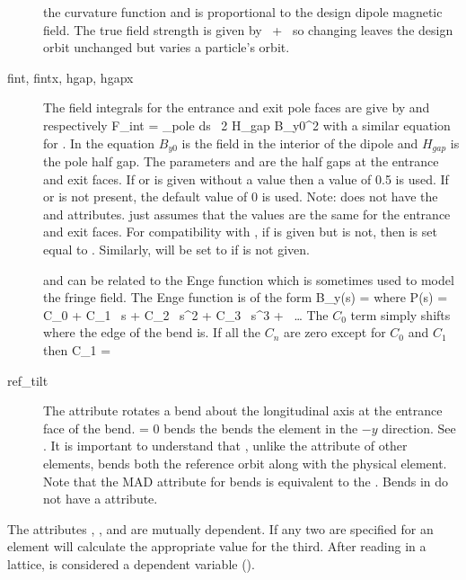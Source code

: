 \begin{description}
the curvature function and is proportional to the design dipole
magnetic field. The true field strength is given by
~+~ so changing  leaves the design orbit
unchanged but varies a particle's orbit.
  \item[fint, fintx, \Newline hgap, hgapx] \Newline
The field integrals for the entrance and
exit pole faces are give by  and  respectively
\Begineq
  F_{int} = \int_{pole} \! \! ds \, 
  {2 H_{gap} B_{y0}^2}
\Endeq
with a similar equation for . In the equation $B_{y0}$ is
the field in the interior of the dipole and $H_{gap}$ is the pole half
gap.  The parameters  and  are the half gaps at the
entrance and exit faces. If  or  is given without a
value then a value of 0.5 is used. If  or  is not
present, the default value of 0 is used. Note: \mad does not have the
 and  attributes. \mad just assumes that the
values are the same for the entrance and exit faces. For compatibility
with \mad, if  is given but  is not, then
 is set equal to . Similarly,  will be
set to  if  is not given.

 and  can be related to the Enge function which is sometimes
used to model the fringe field. The Enge function is of the form
\Begineq
  B_y(s) = 
\Endeq
where
\Begineq
  P(s) = C_0 + C_1 \, s + C_2 \, s^2 + C_3 \, s^3 + \, \ldots
\Endeq
The $C_0$ term simply shifts where the edge of the bend is. If all the $C_n$
are zero except for $C_0$ and $C_1$ then 
\Begineq
  C_1 = 
\Endeq
  \item[ref_tilt] \Newline
The  attribute rotates a bend about the longitudinal axis
at the entrance face of the bend.  = 0 bends the bends
the element in the $-y$ direction. See . It is
important to understand that , unlike the 
attribute of other elements, bends both the reference orbit along with
the physical element. Note that the MAD  attribute for bends
is equivalent to the \bmad {}. Bends in \bmad do not have
a  attribute.
  \end{description}

The attributes , , and  are mutually dependent. If any two are
specified for an element \bmad will calculate the appropriate value
for the third.  After reading in a lattice,  is considered a
dependent variable ().

